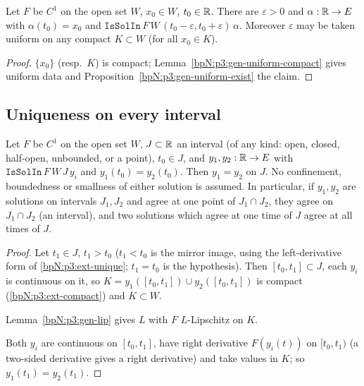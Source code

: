 \begin{theorem}\label{bpN:p3:gen-local}
Let $F$ be $C^1$ on the open set $W$, $x_0\in W$, $t_0\in\mathbb{R}$. There are $\varepsilon>0$ and $\alpha:\mathbb{R}\to E$ with $\alpha(t_0)=x_0$ and
$\texttt{IsSolIn}\,F\,W\,(t_0-\varepsilon,t_0+\varepsilon)\,\alpha$. Moreover $\varepsilon$ may be taken uniform on any compact
$K\subset W$ (for all $x_0\in K$).
\end{theorem}
\begin{proof}
\label{stepN:p3:loc-red} $\{x_0\}$ (resp.\ $K$) is compact; Lemma~\ref{bpN:p3:gen-uniform-compact} gives uniform data and Proposition~\ref{bpN:p3:gen-uniform-exist} the claim.
\end{proof}

\subsection{Uniqueness on every interval}\label{bpN:p3:s-unique}

\begin{theorem}\label{bpN:p3:gen-uniqueness}
Let $F$ be $C^1$ on the open set $W$, $J\subset\mathbb{R}$ an interval (of any kind: open, closed, half-open, unbounded, or
a point), $t_0\in J$, and $y_1,y_2:\mathbb{R}\to E$ with $\texttt{IsSolIn}\,F\,W\,J\,y_i$ and $y_1(t_0)=y_2(t_0)$. Then
$y_1=y_2$ on $J$. No confinement, boundedness or smallness of either solution is assumed.
In particular, if $y_1,y_2$ are solutions on intervals $J_1,J_2$ and agree at one point of $J_1\cap J_2$, they agree on
$J_1\cap J_2$ (an interval), and two solutions which agree at one time of $J$ agree at all times of $J$.
\end{theorem}
\begin{proof}
\label{stepN:p3:uq-compact} Let $t_1\in J$, $t_1>t_0$ ($t_1<t_0$ is the mirror image, using the left-derivative form of \ref{bpN:p3:ext-unique}; $t_1=t_0$ is the hypothesis).
Then $[t_0,t_1]\subset J$, each $y_i$ is continuous on it, so $K=y_1([t_0,t_1])\cup y_2([t_0,t_1])$ is compact
(\ref{bpN:p3:ext-compact}) and $K\subset W$.

\label{stepN:p3:uq-lip} Lemma~\ref{bpN:p3:gen-lip} gives $L$ with $F$ $L$-Lipschitz on $K$.

\label{stepN:p3:uq-apply} Both $y_i$ are continuous on $[t_0,t_1]$, have right derivative $F(y_i(t))$ on $[t_0,t_1)$ (a two-sided derivative gives a right derivative) and take values in $K$; so
$y_1(t_1)=y_2(t_1)$.
\end{proof}

